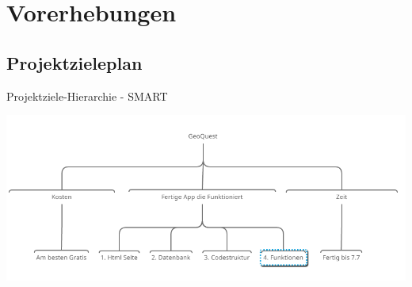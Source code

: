 \section{Vorerhebungen}
\subsection{Projektzieleplan}
Projektziele-Hierarchie - SMART

\begin{center}
	\includegraphics[width=1\linewidth]{Zielplanung}
\end{center}
